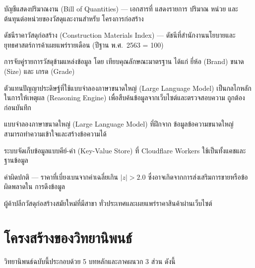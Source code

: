 \begin{description}[leftmargin=3em,labelwidth=2.5em]
  \item[BOQ] บัญชีแสดงปริมาณงาน (Bill of Quantities) --- เอกสารที่
        แสดงรายการ ปริมาณ หน่วย และต้นทุนต่อหน่วยของวัสดุและงานสำหรับ
        โครงการก่อสร้าง
  \item[CMI] ดัชนีราคาวัสดุก่อสร้าง (Construction Materials Index)
        --- ดัชนีที่สำนักงานนโยบายและยุทธศาสตร์การค้าเผยแพร่รายเดือน
        (ปีฐาน พ.ศ.\ 2563 = 100)
  \item[Canonicalization] การจับคู่รายการวัสดุข้ามแหล่งข้อมูล โดย
        เทียบคุณลักษณะมาตรฐาน ได้แก่ ยี่ห้อ (Brand) ขนาด (Size) และ
        เกรด (Grade)
  \item[AI Agent] ตัวแทนปัญญาประดิษฐ์ที่ใช้แบบจำลองภาษาขนาดใหญ่
        (Large Language Model) เป็นกลไกหลักในการให้เหตุผล
        (Reasoning Engine) เพื่อสืบค้นข้อมูลจากเว็บไซต์และตรวจสอบความ
        ถูกต้องก่อนบันทึก
  \item[LLM] แบบจำลองภาษาขนาดใหญ่ (Large Language Model) ที่ฝึกจาก
        ข้อมูลข้อความขนาดใหญ่ สามารถทำความเข้าใจและสร้างข้อความได้
  \item[KV Store] ระบบจัดเก็บข้อมูลแบบคีย์-ค่า (Key-Value Store)
        ที่ Cloudflare Workers ใช้เป็นทั้งแคชและฐานข้อมูล
  \item[Outlier] ค่าผิดปกติ --- ราคาที่เบี่ยงเบนจากค่าเฉลี่ยเกิน
        $|z| > 2.0$ ซึ่งอาจเกิดจากการส่งเสริมการขายหรือข้อผิดพลาดใน
        การดึงข้อมูล
  \item[Modern Trade] ผู้ค้าปลีกวัสดุก่อสร้างสมัยใหม่ที่มีสาขา
        ทั่วประเทศและเผยแพร่ราคาสินค้าผ่านเว็บไซต์
\end{description}

\section{โครงสร้างของวิทยานิพนธ์}
\label{sec:structure}

วิทยานิพนธ์ฉบับนี้ประกอบด้วย 5 บทหลักและภาคผนวก 3 ส่วน ดังนี้

